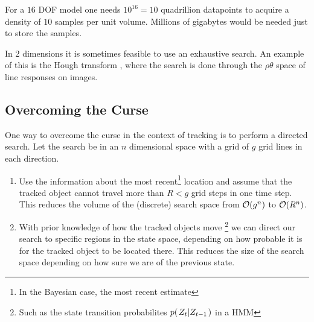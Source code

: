 \begin{example}
  For a $16$ DOF model one needs $10^{16}=10$ quadrillion datapoints to acquire a density of $10$ samples per unit volume. Millions of gigabytes would be needed just to store the samples.
\end{example}

\begin{example}
  In 2 dimensions it is sometimes feasible to use an exhaustive search.
  An example of this is the Hough transform \cite{DigitalImageProcessing}, 
  where the search is done through the $\rho\theta$ space of line responses on images.
\end{example}

\subsection{Overcoming the Curse}
One way to overcome the curse in the context of tracking is to perform a directed search. Let the search be in an $n$ dimensional space with a grid of $g$ grid lines in each direction.

\begin{enumerate}
    \item Use the information about the most recent\footnote{In the Bayesian case, the most recent estimate} 
    location and assume that the tracked object cannot travel more than $R < g$ grid steps in one time step. 
    This reduces the volume of the (discrete) search space from $\mathcal{O}{\left(g^n\right)}$ to $\mathcal{O}{\left(R^n\right)}$.
    \item With prior knowledge of how the tracked objects move
    \footnote{Such as the state transition probabilites $p{(\left. Z_t \middle\vert Z_{t-1} \right.)}$ in a HMM} 
    we can direct our search to specific regions in the state space, 
    depending on how probable it is for the tracked object to be located there. This reduces the size of the
    search space depending on how sure we are of the previous state.
\end{enumerate} 


